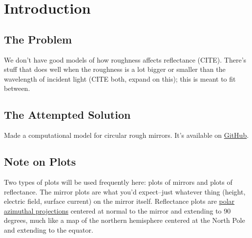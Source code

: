 \documentclass[etd,twoside,senior]{BYUPhys}
\begin{document}
\frontmatter

\makepreliminarypages

\tableofcontents

\mainmatter






\chapter{Introduction} \label{chap:intro}

\section{The Problem} \label{sec:problem}

We don't have good models of how roughness affects reflectance (CITE). There's stuff that does well when the roughness is a lot bigger or smaller than the wavelength of incident light (CITE both, expand on this); this is meant to fit between.



\section{The Attempted Solution} \label{sec:attempted_solution}

Made a computational model for circular rough mirrors. It's available on \href{https://github.com/mjg0/Mirrors.jl}{GitHub}.



\section{Note on Plots} \label{sec:plots_note}

Two types of plots will be used frequently here: plots of mirrors and plots of reflectance. The mirror plots are what you'd expect--just whatever thing (height, electric field, surface current) on the mirror itself. Reflectance plots are \href{}{polar azimuthal projections} centered at normal to the mirror and extending to 90 degrees, much like a map of the northern hemisphere centered at the North Pole and extending to the equator.
\end{document}
